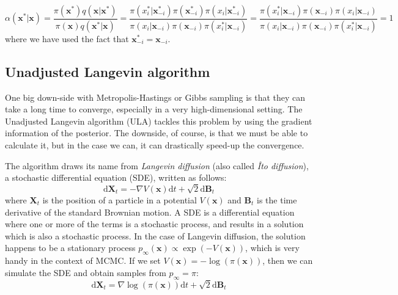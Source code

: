 \documentclass[12pt]{memoir}
\newcommand{\mb}{\mathbf}
\newcommand{\ti}{\textit}
\begin{document}
\begin{equation}
    \alpha(\mb x^*|\mb x) = \frac{\pi(\mb x^*) q(\mb x|\mb x^*)}{\pi(\mb x) q(\mb x^* |\mb x)} = \frac{\pi(x_i^*|\mb x_{-i}^*)\pi(\mb x^*_{-i}) \pi(x_i|\mb x^*_{-i})}{\pi(x_i|\mb x_{-i})\pi(\mb x_{-i}) \pi(x_i^*|\mb x_{-i})} = \frac{\pi( x_i^*|\mb x_{-i})\pi(\mb x_{-i}) \pi(x_i|\mb x_{-i})}{\pi(x_i|\mb x_{-i})\pi(\mb x_{-i}) \pi(x_i^*|\mb x_{-i})} = 1
\end{equation}
where we have used the fact that $\mb x^*_{-i} = \mb x_{-i}$.


\subsection{Unadjusted Langevin algorithm}\label{section:ula}
One big down-side with Metropolis-Hastings or Gibbs sampling is that they can take a long time to converge, especially in a very high-dimensional setting. The Unadjusted Langevin algorithm (ULA) tackles this problem by using the gradient information of the posterior. The downside, of course, is that we must be able to calculate it, but in the case we can, it can drastically speed-up the convergence.\medbreak

The algorithm draws its name from \ti{Langevin diffusion} (also called \ti{Îto diffusion}), a stochastic differential equation (SDE), written as follows:
\begin{equation}
    \mathrm{d}\mb X_t = -\nabla V(\mb x)\mathrm{d}t + \sqrt{2}\mathrm{d}\mb B_t
\end{equation}
where $\mb X_t$ is the position of a particle in a potential $V(\mb x)$ and $\mb B_t$ is the time derivative of the standard Brownian motion. A SDE is a differential equation where one or more of the terms is a stochastic process, and results in a solution which is also a stochastic process. In the case of Langevin diffusion, the solution happens to be a stationary process $p_{\infty}(\mb x) \propto \exp(-V(\mb x))$, which is very handy in the context of MCMC. If we set $V(\mb x) = -\log(\pi(\mb x))$, then we can simulate the SDE and obtain samples from $p_\infty = \pi$:
\begin{equation}    
    \mathrm{d}\mb X_t = \nabla \log(\pi(\mb x))\mathrm{d}t + \sqrt{2}\mathrm{d}\mb B_t
\end{equation}
\end{document}
